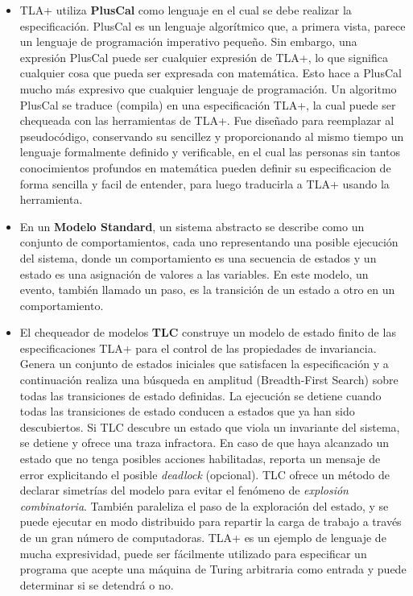\documentclass[spanish]{llncs}
\begin{document}
  \begin{itemize}
    \item TLA+ utiliza \textbf{PlusCal} como lenguaje en el cual se debe realizar la especificación.
	  PlusCal es un lenguaje algorítmico que, a primera vista, parece un lenguaje de programación imperativo pequeño. Sin embargo, una expresión PlusCal puede ser cualquier expresión de TLA+, lo que significa cualquier cosa que pueda ser expresada con matemática. Esto hace a PlusCal mucho más expresivo que cualquier lenguaje de programación.
	  Un algoritmo PlusCal se traduce (compila) en una especificación TLA+, la cual puede ser chequeada con las herramientas de TLA+.
	  Fue diseñado para  reemplazar al  pseudocódigo, conservando su sencillez y proporcionando al mismo tiempo un lenguaje formalmente definido y verificable, en el cual las personas sin tantos conocimientos profundos en matemática pueden definir su especificacion de forma sencilla y facil de entender,
	  para luego traducirla a TLA+ usando la herramienta.
    \item En un \textbf{Modelo Standard}, un sistema abstracto se describe como un conjunto de comportamientos, cada uno representando una posible ejecución del sistema, donde un comportamiento es una secuencia de estados y un estado es una asignación de valores a las variables.
	  En este modelo, un evento, también llamado un paso, es la transición de un estado a otro en un comportamiento.
    \item El chequeador de modelos \textbf{TLC} construye un modelo de estado finito de las especificaciones TLA+ para el control de las propiedades de invariancia.
	  Genera un conjunto de estados iniciales que satisfacen la especificación y a continuación realiza una búsqueda en amplitud (Breadth-First Search) sobre todas las transiciones de estado definidas. 
	  La ejecución se detiene cuando todas las transiciones de estado conducen a estados que ya han sido descubiertos. Si TLC descubre un estado que viola un invariante del sistema, se detiene y ofrece una traza infractora. En caso de que haya alcanzado un estado que no tenga posibles acciones habilitadas, 
	  reporta un mensaje de error explicitando el posible \textit{deadlock} (opcional).
	  TLC ofrece un método de declarar simetrías del modelo para evitar el fenómeno de \textit{explosión combinatoria}.
	  También paraleliza el paso de la exploración del estado, y se puede ejecutar en modo distribuido para repartir la carga de trabajo a través de un gran número de computadoras.
	  TLA+ es un ejemplo de lenguaje de mucha expresividad, puede ser fácilmente utilizado para especificar un programa que acepte una máquina de Turing arbitraria como entrada y puede determinar si se detendrá o no.

\end{itemize}
\end{document}
